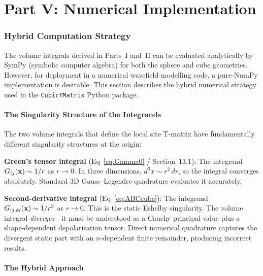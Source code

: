 
\part*{Part V: Numerical Implementation}

\section{Hybrid Computation Strategy}

The volume integrals derived in Parts~I and~II can be evaluated analytically
by SymPy (symbolic computer algebra) for both the sphere and cube geometries.
However, for deployment in a numerical wavefield-modelling code, a pure-NumPy
implementation is desirable.  This section describes the hybrid numerical
strategy used in the \texttt{CubicTMatrix} Python package.

\subsection{The Singularity Structure of the Integrands}

The two volume integrals that define the local site T-matrix have
fundamentally different singularity structures at the origin:

\textbf{Green's tensor integral} (Eq~\ref{eq:Gamma0} / Section~13.1): The integrand
$G_{ij}(\mathbf{x}) \sim 1/r$ as $r \to 0$. In three dimensions,
$d^3x \sim r^2\,dr$, so the integral converges absolutely. Standard 3D
Gauss--Legendre quadrature evaluates it accurately.

\textbf{Second-derivative integral} (Eq~\ref{eq:ABCcube}): The integrand
$G_{ij,kl}(\mathbf{x}) \sim 1/r^3$ as $r \to 0$. This is the static
Eshelby singularity. The volume integral \emph{diverges}---it must be
understood as a Cauchy principal value plus a shape-dependent depolarisation
tensor. Direct numerical quadrature captures the divergent static part with
an $n$-dependent finite remainder, producing incorrect results.

\subsection{The Hybrid Approach}

